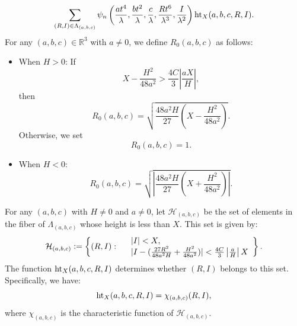 \documentclass{article}
\def \h{{\rm ht}}
\def\JR{\frac{27R^2}{48a^2H}+\frac{H^2}{48a^2}}
\begin{document}
\begin{equation*} \sum_{(R, I) \in \Lambda_{(a, b, c)}} \psi_{n} \left( \frac{at^4}{\lambda}, \frac{bt^2}{\lambda}, \frac{c}{\lambda}, \frac{Rt^6}{\lambda^3}, \frac{I}{\lambda^2} \right) \h_X(a, b, c, R, I). \end{equation*}
For any $(a, b, c) \in \mathbb{R}^3$ with $a \neq 0$, we define $R_0(a, b, c)$ as follows:

\begin{itemize}
    \item  When $H > 0$: If  
    \begin{equation}\label{R0Hp}
        X - \frac{H^2}{48a^2} > \frac{4C}{3} \left| \frac{aX}{H} \right|,
    \end{equation}
    then  
    \begin{equation*}
        R_0(a, b, c) = \sqrt{\frac{48a^2 H}{27} \left( X - \frac{H^2}{48a^2} \right)}.
    \end{equation*}
    Otherwise, we set  
    \begin{equation*}
        R_0(a, b, c) = 1.
    \end{equation*}

    \item  When $H < 0$:
    \begin{equation}\label{RoHn}
        R_0(a, b, c) = \sqrt{\left| \frac{48a^2 H}{27} \left( X + \frac{H^2}{48a^2} \right) \right|}.
    \end{equation}
\end{itemize}
For any $(a, b, c)$ with $H \neq 0$ and $a \neq 0$, let $\mathcal{H}_{(a, b, c)}$ be the set of elements in the fiber of $\Lambda_{(a, b, c)}$ whose height is less than $X$. This set is given by:
\begin{equation}\label{H_def} 
    \mathcal{H}_{(a,b,c)} \vcentcolon = \left\{(R,I) :  
    \begin{array}{ll} 
        & |I| < X, \\  
        & |I - (\JR)| < \frac{4C}{3} \left| \frac{a}{H} \right| X 
    \end{array}  
    \right\}.  
\end{equation}
The function $\h_{X}(a, b, c, R, I)$ determines whether $(R, I)$ belongs to this set. Specifically, we have:
\begin{equation*}
    \h_{X}(a, b, c, R, I) = \chi_{{(a, b, c)}}(R, I),
\end{equation*}
where $\chi_{{(a, b, c)}}$ is the characteristic function of $\mathcal{H}_{(a, b, c)}$.
\end{document}

